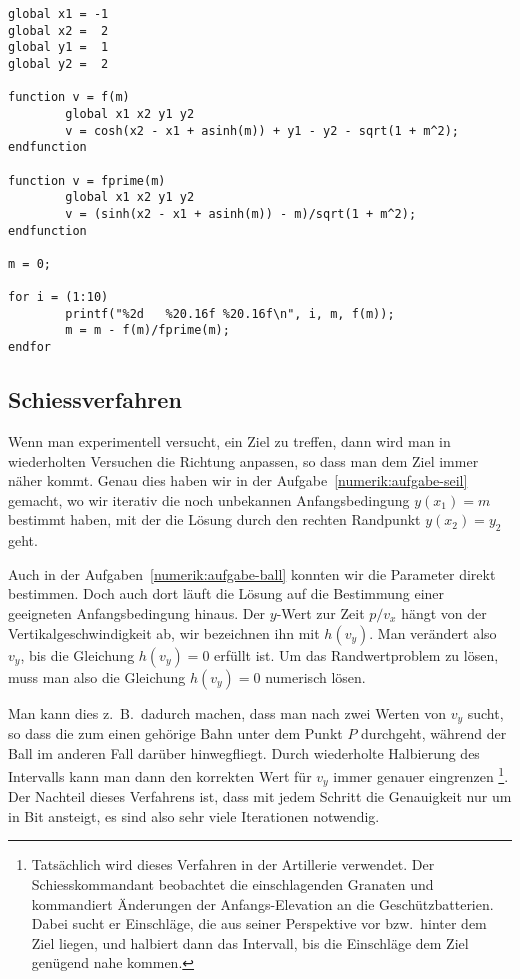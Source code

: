 \begin{lstlisting}[style=Octave,float,caption={Octave-Programm zur Bestimmung der Anfangssteigung $m$ im Kettenlinien-Problem},label={numerik:ketteprog}]
global x1 = -1
global x2 =  2
global y1 =  1
global y2 =  2

function v = f(m)
        global x1 x2 y1 y2
        v = cosh(x2 - x1 + asinh(m)) + y1 - y2 - sqrt(1 + m^2);
endfunction

function v = fprime(m)
        global x1 x2 y1 y2
        v = (sinh(x2 - x1 + asinh(m)) - m)/sqrt(1 + m^2);
endfunction

m = 0;

for i = (1:10)
        printf("%2d   %20.16f %20.16f\n", i, m, f(m));
        m = m - f(m)/fprime(m);
endfor
\end{lstlisting}

\subsection{Schiessverfahren\label{numerik:schiess-verfahren}}
%
Wenn man experimentell versucht, ein Ziel zu treffen, dann wird man
in wiederholten Versuchen die Richtung anpassen, so dass man dem Ziel
immer näher kommt.
Genau dies haben wir in der Aufgabe~\ref{numerik:aufgabe-seil} gemacht,
wo wir iterativ die noch unbekannen Anfangsbedingung $y(x_1)=m$ bestimmt
haben, mit der die Lösung durch den rechten Randpunkt $y(x_2)=y_2$ geht.

Auch in der Aufgaben~\ref{numerik:aufgabe-ball} konnten wir die
Parameter direkt bestimmen.
Doch auch dort läuft die Lösung auf die Bestimmung einer 
geeigneten Anfangsbedingung hinaus.
Der $y$-Wert zur Zeit $p/v_x$ hängt von der Vertikalgeschwindigkeit ab,
wir bezeichnen ihn mit $h(v_y)$.
Man verändert also $v_y$, bis die Gleichung $h(v_y)=0$ erfüllt ist.
Um das Randwertproblem zu lösen, muss man also die Gleichung $h(v_y)=0$
numerisch lösen.

Man kann dies z.~B.~dadurch machen, dass man nach zwei Werten von $v_y$
sucht, so dass die zum einen gehörige Bahn unter dem Punkt $P$ durchgeht,
während der Ball im anderen Fall darüber hinwegfliegt.
Durch wiederholte Halbierung des Intervalls kann man dann den korrekten
Wert für $v_y$ immer genauer eingrenzen%
\footnote{%
Tatsächlich wird dieses Verfahren in der Artillerie verwendet.
%
Der Schiesskommandant beobachtet die einschlagenden Granaten und kommandiert
Änderungen der Anfangs-Elevation an die Geschützbatterien.
Dabei sucht er Einschläge, die aus seiner Perspektive vor bzw.~hinter
dem Ziel liegen, und halbiert dann das Intervall, bis die Einschläge dem
Ziel genügend nahe kommen.}.
Der Nachteil dieses Verfahrens ist, dass mit jedem Schritt die Genauigkeit
nur um in Bit ansteigt, es sind also sehr viele Iterationen notwendig.

